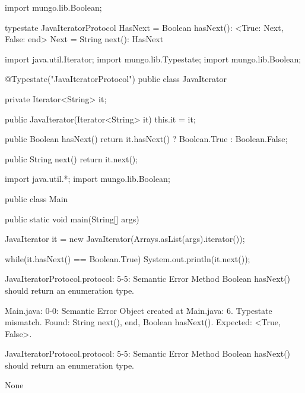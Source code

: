 \begin{code}
import mungo.lib.Boolean;

typestate JavaIteratorProtocol {
  HasNext = {
    Boolean hasNext(): <True: Next, False: end>
  }
  Next = {
    String next(): HasNext
  }
}\end{code}

\begin{code}
import java.util.Iterator;
import mungo.lib.Typestate;
import mungo.lib.Boolean;

@Typestate("JavaIteratorProtocol")
public class JavaIterator {

  private Iterator<String> it;

  public JavaIterator(Iterator<String> it) {
    this.it = it;
  }

	public Boolean hasNext() {
    return it.hasNext() ? Boolean.True : Boolean.False;
  }

  public String next() {
    return it.next();
  }

}\end{code}

\begin{code}
import java.util.*;
import mungo.lib.Boolean;

public class Main {
	public static void main(String[] args) {
		JavaIterator it = new JavaIterator(Arrays.asList(args).iterator());
    
    while(it.hasNext() == Boolean.True){
      System.out.println(it.next());
    }
	}
}\end{code}

\lstset{caption=Original Mungo output}
\begin{code}

JavaIteratorProtocol.protocol: 5-5: Semantic Error
		Method Boolean hasNext() should return an enumeration type.

Main.java: 0-0: Semantic Error
		Object created at Main.java: 6. Typestate mismatch. Found: String next(), end, Boolean hasNext(). Expected: <True, False>.

JavaIteratorProtocol.protocol: 5-5: Semantic Error
		Method Boolean hasNext() should return an enumeration type.
\end{code}

\lstset{caption=New Mungo output}
\begin{code}
None
\end{code}

